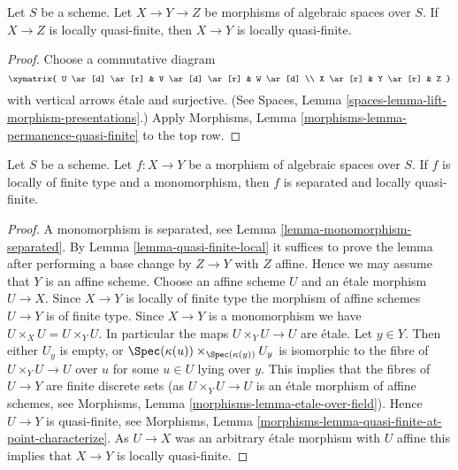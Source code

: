 \begin{lemma}
\label{lemma-permanence-quasi-finite}
Let $S$ be a scheme.
Let $X \to Y \to Z$ be morphisms of algebraic spaces over $S$.
If $X \to Z$ is locally quasi-finite, then $X \to Y$
is locally quasi-finite.
\end{lemma}

\begin{proof}
Choose a commutative diagram
$$
\xymatrix{
U \ar[d] \ar[r] & V \ar[d] \ar[r] & W \ar[d] \\
X \ar[r] & Y \ar[r] & Z
}
$$
with vertical arrows \'etale and surjective. (See
Spaces, Lemma \ref{spaces-lemma-lift-morphism-presentations}.)
Apply
Morphisms, Lemma \ref{morphisms-lemma-permanence-quasi-finite}
to the top row.
\end{proof}

\begin{lemma}
\label{lemma-monomorphism-loc-finite-type-loc-quasi-finite}
Let $S$ be a scheme.
Let $f : X \to Y$ be a morphism of algebraic spaces over $S$.
If $f$ is locally of finite type and a monomorphism, then $f$
is separated and locally quasi-finite.
\end{lemma}

\begin{proof}
A monomorphism is separated, see
Lemma \ref{lemma-monomorphism-separated}.
By
Lemma \ref{lemma-quasi-finite-local}
it suffices to prove the lemma after performing a base change
by $Z \to Y$ with $Z$ affine. Hence we may assume that $Y$ is an
affine scheme. Choose an affine scheme $U$ and an \'etale morphism
$U \to X$. Since $X \to Y$ is locally of finite type the morphism
of affine schemes $U \to Y$ is of finite type.
Since $X \to Y$ is a monomorphism we have $U \times_X U = U \times_Y U$.
In particular the maps $U \times_Y U \to U$ are \'etale.
Let $y \in Y$. Then either $U_y$ is empty, or
$\Spec(\kappa(u)) \times_{\Spec(\kappa(y))} U_y$
is isomorphic to the fibre of $U \times_Y U \to U$ over $u$ for
some $u \in U$ lying over $y$. This implies that the fibres of
$U \to Y$ are finite discrete sets (as $U \times_Y U \to U$
is an \'etale morphism of affine schemes, see
Morphisms, Lemma \ref{morphisms-lemma-etale-over-field}).
Hence $U \to Y$ is quasi-finite, see
Morphisms, Lemma \ref{morphisms-lemma-quasi-finite-at-point-characterize}.
As $U \to X$ was an arbitrary \'etale morphism with $U$ affine
this implies that $X \to Y$ is locally quasi-finite.
\end{proof}














